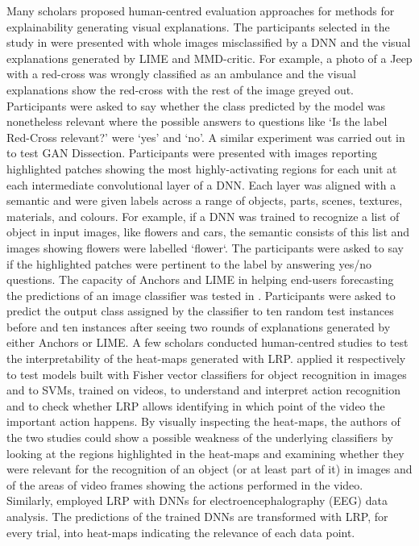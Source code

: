 \documentclass[final,1p,times]{elsarticle}
\begin{document}
Many scholars proposed human-centred evaluation approaches for methods for explainability generating visual explanations. The participants selected in the study in \cite{stock2018convnets} were presented with whole images misclassified by a DNN and the visual explanations generated by LIME and MMD-critic. For example, a photo of a Jeep with a red-cross was wrongly classified as an ambulance and the visual explanations show the red-cross with the rest of the image greyed out. Participants were asked to say whether the class predicted by the model was nonetheless relevant where the possible answers to questions like `Is the label Red-Cross relevant?' were `yes' and `no'.
A similar experiment was carried out in \cite{bau2017network} to test GAN Dissection. Participants were presented with images reporting highlighted patches showing the most highly-activating regions for each unit at each intermediate convolutional layer of a DNN. Each layer was aligned with a semantic and were given labels across a range of objects, parts, scenes, textures, materials, and colours. For example, if a DNN was trained to recognize a list of object in input images, like flowers and cars, the semantic consists of this list and images showing flowers were labelled `flower`. The participants were asked to say if the highlighted patches were pertinent to the label by answering yes/no questions.
The capacity of Anchors and LIME in helping end-users forecasting the predictions of an image classifier was tested in \cite{ribeiro2018anchors}. Participants were asked to predict the output class assigned by the classifier to ten random test instances before and ten instances after seeing two rounds of explanations generated by either Anchors or LIME.
A few scholars conducted human-centred studies to test the interpretability of the heat-maps generated with LRP. \cite{lapuschkin2016analyzing,srinivasan2017interpretable} applied it respectively to test models built with Fisher vector classifiers for object recognition in images and to SVMs, trained on videos, to understand and interpret action recognition and to check whether LRP allows identifying in which point of the video the important action happens. 
By visually inspecting the heat-maps, the authors of the two studies could show a possible weakness of the underlying classifiers by looking at the regions highlighted in the heat-maps and examining whether they were relevant for the recognition of an object (or at least part of it) in images and of the areas of video frames showing the actions performed in the video. 
Similarly, \cite{sturm2016interpretable} employed LRP with DNNs for electroencephalography (EEG) data analysis. The predictions of the trained DNNs are transformed with LRP, for every trial, into heat-maps indicating the relevance of each data point. 
\end{document}
